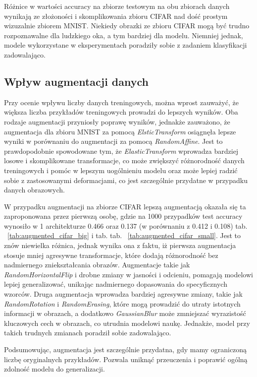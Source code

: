 \documentclass[10pt]{article}
\begin{document}
Różnice w wartości accuracy na zbiorze testowym na obu zbiorach danych wynikają ze złożoności i skomplikowania zbioru CIFAR nad dość prostym wizuzalnie zbiorem MNIST.
Niekiedy obrazki ze zbioru CIFAR mogą być trudno rozpoznawalne dla ludzkiego oka, a tym bardziej dla modelu.
Niemniej jednak, modele wykorzystane w eksperymentach poradziły sobie z zadaniem klasyfikacji zadowalająco.

\subsection*{Wpływ augmentacji danych}
Przy ocenie wpływu liczby danych treningowych, można wprost zauważyć, że większa liczba przykładów treningowych prowadzi do lepszych wyników.
Oba rodzaje augmentacji przyniosły poprawę wyników, jednakże zauważono, że augmentacja dla zbioru MNIST za pomocą \textit{ElsticTransform} osiągnęła lepsze wyniki w porównaniu do augmentacji za pomocą \textit{RandomAffine}.
Jest to prawdopodobnie spowodowane tym, że \textit{ElasticTransform} wprowadza bardziej losowe i skomplikowane transformacje, co może zwiększyć różnorodność danych treningowych i pomóc w lepszym uogólnieniu modelu oraz może lepiej radzić sobie z zastosowanymi deformacjami, co jest szczególnie przydatne w przypadku danych obrazowych.

W przypadku augmentacji na zbiorze CIFAR lepszą augmentacją okazała się ta zaproponowana przez pierwszą osobę, gdzie na 1000 przypadków test accuracy wynosiło w 1 architekturze 0.466 oraz 0.137 (w porównaniu z 0.412 i 0.108) tab. ~\ref{tab:augmented_cifar_big} i tab. tab. ~\ref{tab:augmented_cifar_small}.
Jest to znów niewielka różnica, jednak wynika ona z faktu, iż pierwsza augmentacja stosuje mniej agresywne transformacje, które dodają różnorodność bez nadmiernego zniekształcania obrazów.
Augmentacje takie jak \textit{RandomHorizontalFlip} i drobne zmiany w jasności i odcieniu, pomagają modelowi lepiej generalizować, unikając nadmiernego dopasowania do specyficznych wzorców.
Druga augmentacja wprowadza bardziej agresywne zmiany, takie jak \textit{RandomRotation} i \textit{RandomErasing}, które mogą prowadzić do utraty istotnych informacji w obrazach, a dodatkowo \textit{GaussianBlur} może zmniejszać wyrazistość kluczowych cech w obrazach, co utrudnia modelowi naukę.
Jednakże, model przy takich trudnych zmianach poradził sobie zadowalająco.

Podsumowując, augmentacja jest szczególnie przydatna, gdy mamy ograniczoną liczbę oryginalnych przykładów.
Pozwala uniknąć przeuczenia i poprawić ogólną zdolność modelu do generalizacji.
\end{document}

